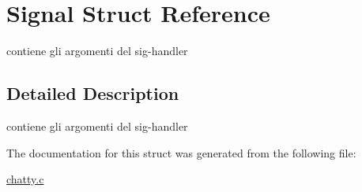 \hypertarget{structSignal}{}\section{Signal Struct Reference}
\label{structSignal}


contiene gli argomenti del sig-\/handler  




\subsection{Detailed Description}
contiene gli argomenti del sig-\/handler 

The documentation for this struct was generated from the following file\+:\begin{DoxyCompactItemize}
\item 
\hyperlink{chatty_8c}{chatty.\+c}\end{DoxyCompactItemize}
